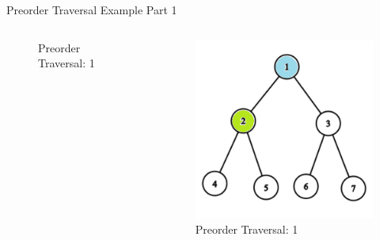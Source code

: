 \documentclass[aspectratio=169]{beamer}%
\begin{document}
\begin{frame}{Preorder Traversal Example Part 1}
\begin{columns}
\begin{column}{0.32\textwidth}
\begin{figure}
                \caption{Preorder Traversal: 1}
            \end{figure}
        \end{column}
        \hfill
        \begin{column}{0.32\textwidth}
            \begin{figure}
                \centering
                \includegraphics[width = .9\linewidth]{tree-pre 3.png}
                \caption{Preorder Traversal: 1}
            \end{figure}
        \end{column}
    \end{columns}
\end{frame}
\end{document}
